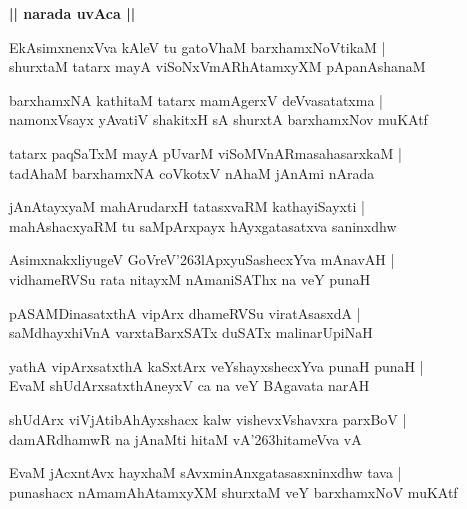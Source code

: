 \documentclass[twoside,12pt,openright]{book}
\def\S{\char'263}
\newcounter{shloka}[chapter]
\def\uvaca#1{\centerline{{\large\textbf{#1}}}}
\begin{document}
\uvaca{|| narada uvAca ||}

\begin{shloka}%
EkAsimxnenxVva kAleV tu gatoVhaM barxhamxNoVtikaM |\\
shurxtaM tatarx mayA viSoNxVmARhAtamxyXM pApanAshanaM 
\end{shloka}

\begin{shloka}%
barxhamxNA kathitaM tatarx mamAgerxV deVvasatatxma |\\
namonxVsayx yAvatiV shakitxH sA shurxtA barxhamxNov muKAtf 
\end{shloka}

\begin{shloka}%
tatarx paqSaTxM mayA pUvarM viSoMVnARmasahasarxkaM |\\
tadAhaM barxhamxNA coVkotxV nAhaM jAnAmi nArada
\end{shloka}

\begin{shloka}%
jAnAtayxyaM mahArudarxH tatasxvaRM kathayiSayxti |\\
mahAshacxyaRM tu saMpArxpayx hAyxgatasatxva saninxdhw
\end{shloka}

\begin{shloka}%
AsimxnakxliyugeV GoVreV\S lApxyuSashecxYva mAnavAH |\\
vidhameRVSu rata nitayxM nAmaniSAThx na veY punaH 
\end{shloka}

\begin{shloka}%
pASAMDinasatxthA vipArx dhameRVSu viratAsasxdA |\\
saMdhayxhiVnA varxtaBarxSATx duSATx malinarUpiNaH 
\end{shloka}

\begin{shloka}%
yathA vipArxsatxthA kaSxtArx veYshayxshecxYva punaH punaH |\\
EvaM shUdArxsatxthAneyxV ca na veY BAgavata narAH
\end{shloka}

\begin{shloka}%
shUdArx viVjAtibAhAyxshacx kalw vishevxVshavxra parxBoV |\\
damARdhamwR na jAnaMti hitaM vA\S hitameVva vA 
\end{shloka}

\begin{shloka}%
EvaM jAcxntAvx hayxhaM sAvxminAnxgatasasxninxdhw tava |\\
punashacx nAmamAhAtamxyXM shurxtaM veY barxhamxNoV muKAtf 
\end{shloka}
\end{document}
